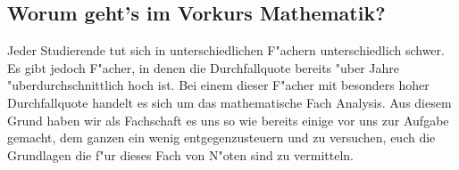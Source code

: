 \subsection{Worum geht's im Vorkurs Mathematik?}
Jeder Studierende tut sich in unterschiedlichen F"achern unterschiedlich schwer.
Es gibt jedoch F"acher, in denen die Durchfallquote bereits "uber Jahre "uberdurchschnittlich hoch ist.
Bei einem dieser F"acher mit besonders hoher Durchfallquote handelt es sich um das mathematische Fach Analysis.
Aus diesem Grund haben wir als Fachschaft es uns so wie bereits einige vor uns zur Aufgabe gemacht, dem ganzen ein wenig entgegenzusteuern und zu versuchen, euch die Grundlagen die f"ur dieses Fach von N"oten sind zu vermitteln.
